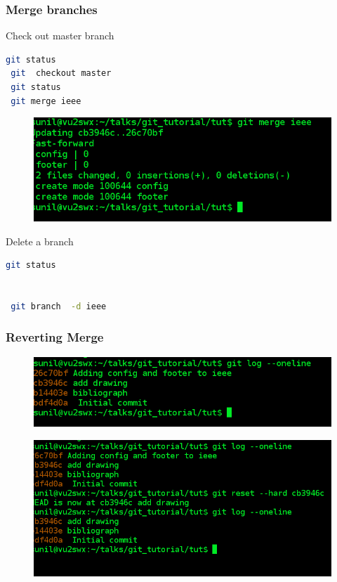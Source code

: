\documentclass[10pt,a4paper]{beamer}
\begin{document}
\begin{frame}[fragile]
\frametitle{ Merge branches  }

  Check out master branch 
  \begin{lstlisting}[language=bash]
 git status
 git  checkout master
 git status
 git merge ieee
\end{lstlisting}

 
\begin{figure}
  \includegraphics[scale=.3]{18}
 \end{figure}
 
 Delete a branch 
   \begin{lstlisting}[language=bash]
 git status
 
 
 git branch  -d ieee
\end{lstlisting}
\end{frame}


\begin{frame}[fragile]
\frametitle{ Reverting Merge  }

  
 
\begin{figure}
  \includegraphics[scale=.3]{19}
 \end{figure}
  
  
  \begin{figure}
  \includegraphics[scale=.3]{20}
 \end{figure}
\end{frame}
\end{document}

